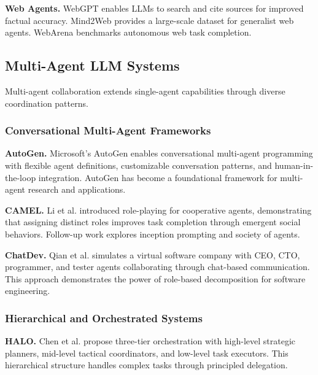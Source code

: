 \documentclass{article}
\theoremstyle{plain}
\theoremstyle{definition}
\theoremstyle{remark}
\begin{document}
\textbf{Web Agents.} WebGPT \citep{nakano2022webgpt} enables LLMs to search and cite sources for improved factual accuracy. Mind2Web \citep{deng2023mind2web} provides a large-scale dataset for generalist web agents. WebArena \citep{zhou2024webarena} benchmarks autonomous web task completion.

\subsection{Multi-Agent LLM Systems}
\label{sec:related_llm}

Multi-agent collaboration extends single-agent capabilities through diverse coordination patterns.

\subsubsection{Conversational Multi-Agent Frameworks}

\textbf{AutoGen.} Microsoft's AutoGen \citep{wu2023autogen} enables conversational multi-agent programming with flexible agent definitions, customizable conversation patterns, and human-in-the-loop integration. AutoGen has become a foundational framework for multi-agent research and applications.

\textbf{CAMEL.} Li et al. \citep{li2023camel} introduced role-playing for cooperative agents, demonstrating that assigning distinct roles improves task completion through emergent social behaviors. Follow-up work explores inception prompting and society of agents.

\textbf{ChatDev.} Qian et al. \citep{qian2023chatdev} simulates a virtual software company with CEO, CTO, programmer, and tester agents collaborating through chat-based communication. This approach demonstrates the power of role-based decomposition for software engineering.

\subsubsection{Hierarchical and Orchestrated Systems}

\textbf{HALO.} Chen et al. \citep{chen2025halo} propose three-tier orchestration with high-level strategic planners, mid-level tactical coordinators, and low-level task executors. This hierarchical structure handles complex tasks through principled delegation.
\end{document}
